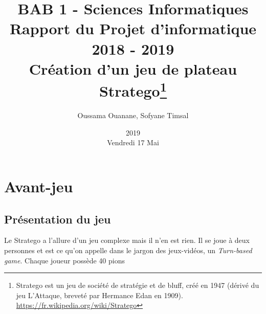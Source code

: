 \documentclass[a4paper, 12pt]{report}
\title{BAB 1 - Sciences Informatiques \\  Rapport du Projet d'informatique 2018 - 2019 \\ Création d'un jeu de plateau Stratego\thanks{Stratego est un jeu de société de stratégie et de bluff, créé en 1947 (dérivé du jeu L'Attaque, breveté par Hermance Edan en 1909). \underline{https://fr.wikipedia.org/wiki/Stratego}}}
\author{Oussama Ouanane, Sofyane Timsal}
\date{2019\\ Vendredi 17 Mai}
\begin{document}

\begin{titlepage}
\clearpage\maketitle
\thispagestyle{empty}
\end{titlepage}


\begin{table}
\tableofcontents
\end{table}
\part{Avant-jeu}
\chapter{Présentation du jeu}
Le Stratego a l'allure d'un jeu complexe mais il n'en est rien. Il se joue à deux personnes et est ce qu'on appelle dans le jargon des jeux-vidéos, un \textit{Turn-based game}. Chaque joueur possède 40 pions
\end{document}
